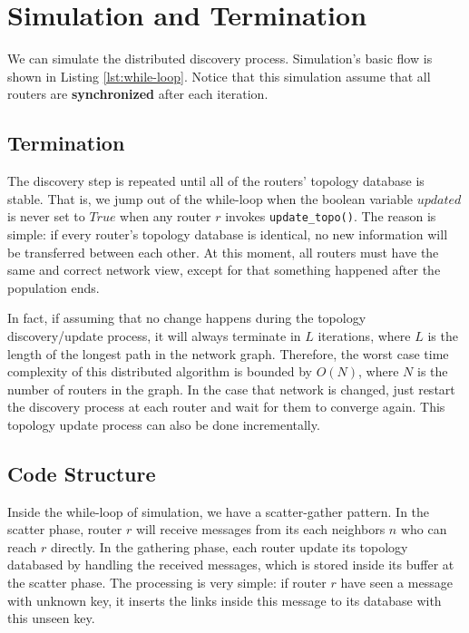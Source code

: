 \documentclass[12pt]{article}  %
\theoremstyle{definition}
\theoremstyle{remark}
\begin{document}
\section{Simulation and Termination}
We can simulate the distributed discovery process.
Simulation's basic flow is shown in Listing \ref{lst:while-loop}.
Notice that this simulation assume that all routers are \textbf{synchronized} after each iteration.

\subsection{Termination}
The discovery step is repeated until all of the routers' topology database is stable.
That is, we jump out of the while-loop when the boolean variable $updated$ is never set to $True$ when any router $r$ invokes \texttt{update\_topo()}.
The reason is simple: if every router's topology database is identical, no new information will be transferred between each other.
At this moment, all routers must have the same and correct network view, except for that something happened after the population ends.

In fact, if assuming that no change happens during the topology discovery/update process, it will always terminate in $L$ iterations, where $L$ is the length of the longest path in the network graph.
Therefore, the worst case time complexity of this distributed algorithm is bounded by $O(N)$, where $N$ is the number of routers in the graph.
In the case that network is changed, just restart the discovery process at each router and wait for them to converge again.
This topology update process can also be done incrementally.

\subsection{Code Structure}
Inside the while-loop of simulation, we have a scatter-gather pattern.
In the scatter phase, router $r$ will receive messages from its each neighbors $n$ who can reach $r$ directly.
In the gathering phase, each router update its topology databased by handling the received messages, which is stored inside its buffer at the scatter phase.
The processing is very simple: if router $r$ have seen a message with unknown key, it inserts the links inside this message to its database with this unseen key.
\end{document}
